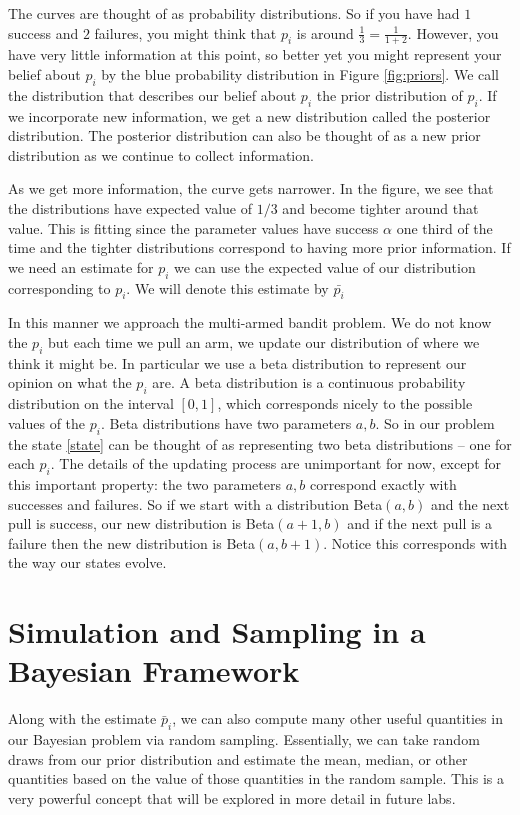 The curves are thought of as probability distributions.  So if you have had $1$ success and $2$ failures, you might think that $p_i$ is around $\frac{1}{3} = \frac{1}{1+2}$. However, you have very little information at this point, so better yet you might represent your belief about $p_i$ by the blue probability distribution in Figure \ref{fig:priors}.  We call the distribution that describes our belief about $p_i$ the prior distribution of $p_i$.  If we incorporate new information, we get a new distribution called the posterior distribution.  The posterior distribution can also be thought of as a new prior distribution as we continue to collect information.

As we get more information, the curve gets narrower.  In the figure, we see that the distributions have expected value of $1/3$ and become tighter around that value.  This is fitting since the parameter values have success $\alpha$ one third of the time and the tighter distributions correspond to having more prior information.  If we need an estimate for $p_i$ we can use the expected value of our distribution corresponding to $p_i$.  We will denote this estimate by $\bar{p_i}$

In this manner we approach the multi-armed bandit problem.  We do not know the $p_i$ but each time we pull an arm, we update our distribution of where we think it might be.  In particular we use a beta distribution to represent our opinion on what the $p_i$ are.  A beta distribution is a continuous probability distribution on the interval $[0,1]$, which corresponds nicely to the possible values of the $p_i$.  Beta distributions have two parameters $a,b$.  So in our problem the state \eqref{state} can be thought of as representing two beta distributions -- one for each $p_i$. The details of the updating process are unimportant for now, except for this important property: the two parameters $a,b$ correspond exactly with successes and failures.  So if we start with a distribution Beta$(a,b)$ and the next pull is success, our new distribution is Beta$(a+1,b)$ and if the next pull is a failure then the new distribution is Beta$(a,b+1)$.  Notice this corresponds with the way our states evolve.

\section*{Simulation and Sampling in a Bayesian Framework}
Along with the estimate $\bar p_i$, we can also compute many other useful quantities in our Bayesian problem via random sampling.  Essentially, we can take random draws from our prior distribution and estimate the mean, median, or other quantities based on the value of those quantities in the random sample.  This is a very powerful concept that will be explored in more detail in future labs.

